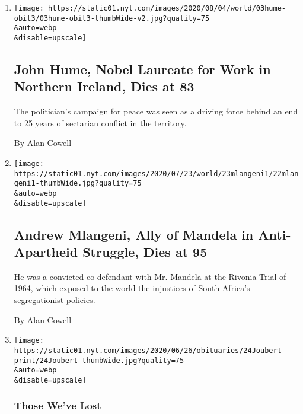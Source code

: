 \begin{enumerate}
\def\labelenumi{\arabic{enumi}.}
\item
  \href{/2020/08/03/obituaries/john-hume-dies.html}{}

  \texttt{[image: https://static01.nyt.com/images/2020/08/04/world/03hume-obit3/03hume-obit3-thumbWide-v2.jpg?quality=75\\\&auto=webp\\\&disable=upscale]}

  \hypertarget{john-hume-nobel-laureate-for-work-in-northern-ireland-dies-at-83}{%
  \subsection{John Hume, Nobel Laureate for Work in Northern Ireland,
  Dies at
  83}\label{john-hume-nobel-laureate-for-work-in-northern-ireland-dies-at-83}}

  The politician's campaign for peace was seen as a driving force behind
  an end to 25 years of sectarian conflict in the territory.

  By Alan Cowell
\item
  \href{/2020/07/22/world/africa/andrew-mlangeni-dead.html}{}

  \texttt{[image: https://static01.nyt.com/images/2020/07/23/world/23mlangeni1/22mlangeni1-thumbWide.jpg?quality=75\\\&auto=webp\\\&disable=upscale]}

  \hypertarget{andrew-mlangeni-ally-of-mandela-in-anti-apartheid-struggle-dies-at-95}{%
  \subsection{Andrew Mlangeni, Ally of Mandela in Anti-Apartheid
  Struggle, Dies at
  95}\label{andrew-mlangeni-ally-of-mandela-in-anti-apartheid-struggle-dies-at-95}}

  He was a convicted co-defendant with Mr. Mandela at the Rivonia Trial
  of 1964, which exposed to the world the injustices of South Africa's
  segregationist policies.

  By Alan Cowell
\item
  \href{/2020/06/25/books/elsa-joubert-dead-coronavirus.html}{}

  \texttt{[image: https://static01.nyt.com/images/2020/06/26/obituaries/24Joubert-print/24Joubert-thumbWide.jpg?quality=75\\\&auto=webp\\\&disable=upscale]}

  \hypertarget{those-weve-lost}{%
  \subsubsection{Those We've Lost}\label{those-weve-lost}}


\end{enumerate}
